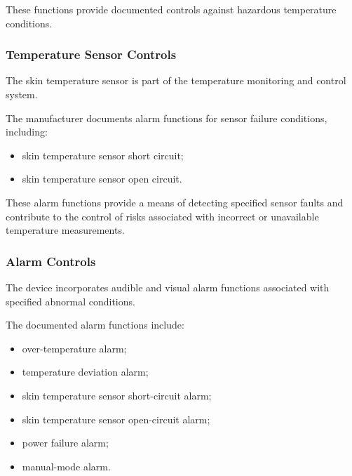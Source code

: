 These functions provide documented controls against hazardous temperature
conditions.

\subsubsection{Temperature Sensor Controls}

The skin temperature sensor is part of the temperature monitoring and
control system.

The manufacturer documents alarm functions for sensor failure conditions,
including:

\begin{itemize}

    \item skin temperature sensor short circuit;

    \item skin temperature sensor open circuit.

\end{itemize}

These alarm functions provide a means of detecting specified sensor faults
and contribute to the control of risks associated with incorrect or
unavailable temperature measurements.

\subsubsection{Alarm Controls}

The device incorporates audible and visual alarm functions associated with
specified abnormal conditions.

The documented alarm functions include:

\begin{itemize}

    \item over-temperature alarm;

    \item temperature deviation alarm;

    \item skin temperature sensor short-circuit alarm;

    \item skin temperature sensor open-circuit alarm;

    \item power failure alarm;

    \item manual-mode alarm.

\end{itemize}

